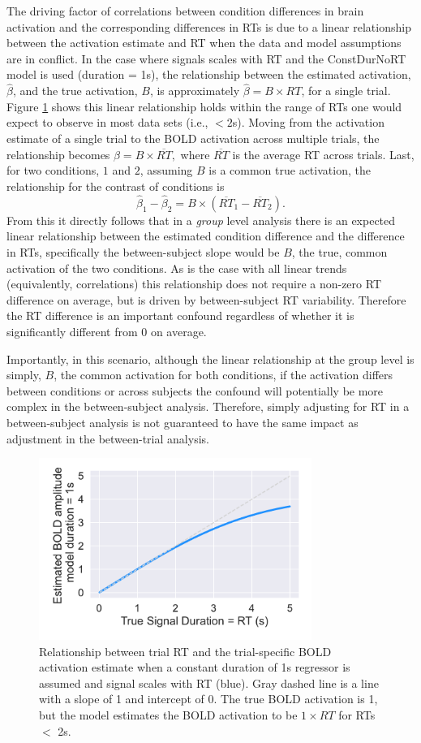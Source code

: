 \documentclass[titlepage,12pt] {article}
\begin{document}
The driving factor of correlations between condition differences in brain activation and the corresponding differences in RTs is due to a linear relationship between the activation estimate and RT when the data and model assumptions are in conflict. In the case where signals scales with RT and the ConstDurNoRT model is used (duration = 1s), the relationship between the estimated activation, $\hat\beta$, and the true activation, $B$, is approximately $\hat\beta = B \times RT$, for a single trial.  Figure \ref{fig:bold_rt} shows this linear relationship holds within the range of RTs one would expect to observe in most data sets (i.e., $<2$s).  Moving from the activation estimate of a single trial to the BOLD activation across multiple trials, the relationship becomes $\hat\beta = B\times \overline{RT}, $ where $\overline{RT}$ is the average RT across trials.  Last, for two conditions, $1$ and $2$, assuming $B$ is a common true activation, the relationship for the contrast of conditions is $$\hat\beta_1 -\hat\beta_2 = B\times\left(\overline{RT}_1 - \overline{RT}_2\right).$$
From this it directly follows that in a \emph{group} level analysis there is an expected linear relationship between the estimated condition difference and the difference in RTs, specifically the between-subject slope would be $B$, the true, common activation of the two conditions.  As is the case with all linear trends (equivalently, correlations) this relationship does not require a non-zero RT difference on average, but is driven by between-subject RT variability. Therefore the RT difference is an important confound regardless of whether it is significantly different from 0 on average.  

Importantly, in this scenario, although the linear relationship at the group level is simply, $B$, the common activation for both conditions, if the activation differs between conditions or across subjects the confound will potentially be more complex in the between-subject analysis.  Therefore, simply adjusting for RT in a between-subject analysis is not guaranteed to have the same impact as adjustment in the between-trial analysis.

\begin{figure}
  \centering
   \includegraphics[width=3.5in]{Figures/bold_fcn_rt_1sdur_only.pdf}
   \caption{Relationship between trial RT and the trial-specific BOLD activation estimate when a constant duration of 1s regressor is assumed and signal scales with RT (blue).  Gray dashed line is a line with a slope of 1 and intercept of 0.  The true BOLD activation is 1, but the model estimates the BOLD activation to be $1\times RT$ for RTs $<$ 2s.}
  \label{fig:bold_rt}
\end{figure}
\end{document}
